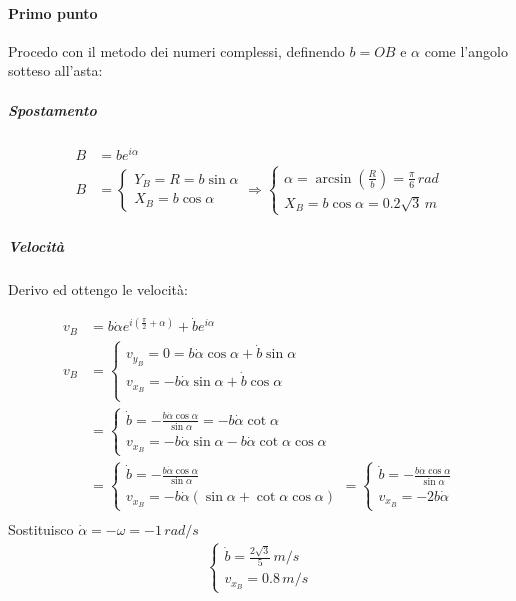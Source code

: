 \documentclass[main.tex]{subfiles}
\begin{document}
\paragraph{Primo punto}
Procedo con il metodo dei numeri complessi, definendo $b=OB$ e $\alpha$ come l'angolo sotteso all'asta:

\subparagraph{Spostamento}

\begin{align*}
	B &= be^{i\alpha}\\
	B &=  \begin{cases}
		Y_B = R = b\sin\alpha\\
		X_B = b\cos\alpha
	\end{cases}
	\Longrightarrow \begin{cases}
		\alpha = \arcsin(\frac{R}{b}) = \frac{\pi}{6}\,rad\\
		X_B = b\cos\alpha = 0.2\sqrt{3}\,m
	\end{cases}
\end{align*}

\subparagraph{Velocità}
Derivo ed ottengo le velocità:

\begin{align*}
	v_B &= b\dot{\alpha}e^{i(\frac{\pi}{2}+\alpha)} + \dot{b}e^{i\alpha} \\
	v_B &=  \begin{cases}
		v_{y_B} = 0 = b\dot{\alpha}\cos\alpha + \dot{b}\sin\alpha\\
		v_{x_B} = -b\dot{\alpha}\sin\alpha + \dot{b}\cos\alpha\\
	\end{cases}\\
	&= \begin{cases}
		\dot{b} = - \frac{b\dot{\alpha}\cos\alpha}{\sin\alpha} = -b\dot{\alpha}\cot\alpha\\
		v_{x_B} =  -b\dot{\alpha}\sin\alpha - b\dot{\alpha}\cot\alpha\cos\alpha
	\end{cases} \\
	&= \begin{cases}
		\dot{b} = - \frac{b\dot{\alpha}\cos\alpha}{\sin\alpha}\\
		v_{x_B} =  -b\dot{\alpha}(\sin\alpha + \cot\alpha\cos\alpha)
	\end{cases} = \begin{cases}
		\dot{b} = - \frac{b\dot{\alpha}\cos\alpha}{\sin\alpha}\\
		v_{x_B} =  -2b\dot{\alpha}
	\end{cases}\\
\end{align*}
Sostituisco $\dot{\alpha}=-\omega=-1\,rad/s$
\begin{align*}
	\begin{cases}
		\dot{b} = \frac{2\sqrt{3}}{5}\,m/s \\
		v_{x_B} = 0.8\,m/s
	\end{cases}
\end{align*}
\end{document}
